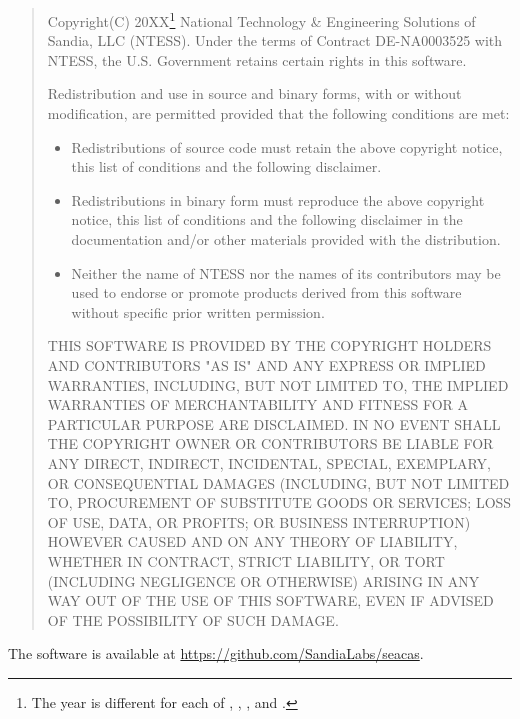 \begin{quote}
Copyright(C) 20XX\footnote{The year is different for each of \epu{},
\exodiff, \ejoin, and \conjoin.} National Technology & Engineering Solutions
of Sandia, LLC (NTESS).  Under the terms of Contract DE-NA0003525 with
NTESS, the U.S. Government retains certain rights in this software.

Redistribution and use in source and binary forms, with or without
modification, are permitted provided that the following conditions are
met:

\begin{itemize}
\item Redistributions of source code must retain the above copyright
      notice, this list of conditions and the following disclaimer.

\item Redistributions in binary form must reproduce the above
      copyright notice, this list of conditions and the following
      disclaimer in the documentation and/or other materials provided
      with the distribution.

\item Neither the name of NTESS nor the names of its
      contributors may be used to endorse or promote products derived
      from this software without specific prior written permission.
\end{itemize}

THIS SOFTWARE IS PROVIDED BY THE COPYRIGHT HOLDERS AND CONTRIBUTORS
"AS IS" AND ANY EXPRESS OR IMPLIED WARRANTIES, INCLUDING, BUT NOT
LIMITED TO, THE IMPLIED WARRANTIES OF MERCHANTABILITY AND FITNESS FOR
A PARTICULAR PURPOSE ARE DISCLAIMED. IN NO EVENT SHALL THE COPYRIGHT
OWNER OR CONTRIBUTORS BE LIABLE FOR ANY DIRECT, INDIRECT, INCIDENTAL,
SPECIAL, EXEMPLARY, OR CONSEQUENTIAL DAMAGES (INCLUDING, BUT NOT
LIMITED TO, PROCUREMENT OF SUBSTITUTE GOODS OR SERVICES; LOSS OF USE,
DATA, OR PROFITS; OR BUSINESS INTERRUPTION) HOWEVER CAUSED AND ON ANY
THEORY OF LIABILITY, WHETHER IN CONTRACT, STRICT LIABILITY, OR TORT
(INCLUDING NEGLIGENCE OR OTHERWISE) ARISING IN ANY WAY OUT OF THE USE
OF THIS SOFTWARE, EVEN IF ADVISED OF THE POSSIBILITY OF SUCH DAMAGE.
\end{quote}

The software is available at \url{https://github.com/SandiaLabs/seacas}.
